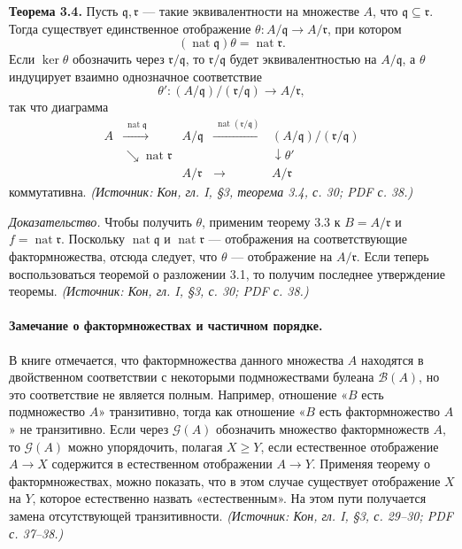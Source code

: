 \documentclass[a4paper,12pt]{article}
\begin{document}
\textbf{Теорема 3.4.} Пусть \(\mathfrak{q},\mathfrak{r}\) — такие эквивалентности на множестве \(A\), что \(\mathfrak{q}\subseteq\mathfrak{r}\). Тогда существует единственное отображение \(\theta\colon A/\mathfrak{q}\to A/\mathfrak{r}\), при котором
\[
(\operatorname{nat}\mathfrak{q})\theta=\operatorname{nat}\mathfrak{r}.
\]
Если \(\ker\theta\) обозначить через \(\mathfrak{r}/\mathfrak{q}\), то \(\mathfrak{r}/\mathfrak{q}\) будет эквивалентностью на \(A/\mathfrak{q}\), а \(\theta\) индуцирует взаимно однозначное соответствие
\[
\theta'\colon (A/\mathfrak{q})/(\mathfrak{r}/\mathfrak{q})\to A/\mathfrak{r},
\]
так что диаграмма
\[
\begin{array}{ccccc}
A & \xrightarrow{\ \operatorname{nat}\mathfrak{q}\ } & A/\mathfrak{q} & \xrightarrow{\ \operatorname{nat}(\mathfrak{r}/\mathfrak{q})\ } & (A/\mathfrak{q})/(\mathfrak{r}/\mathfrak{q})\\
& \searrow{\scriptstyle \operatorname{nat}\mathfrak{r}} & & & \downarrow{\scriptstyle \theta'}\\
& & A/\mathfrak{r} & \xrightarrow{\ \ }\ & A/\mathfrak{r}
\end{array}
\]
коммутативна.
\textit{(Источник: Кон, гл. I, §3, теорема 3.4, с. 30; PDF с. 38.)}

\emph{Доказательство.} Чтобы получить \(\theta\), применим теорему 3.3 к \(B=A/\mathfrak{r}\) и \(f=\operatorname{nat}\mathfrak{r}\). Поскольку \(\operatorname{nat}\mathfrak{q}\) и \(\operatorname{nat}\mathfrak{r}\) — отображения на соответствующие фактормножества, отсюда следует, что \(\theta\) — отображение на \(A/\mathfrak{r}\). Если теперь воспользоваться теоремой о разложении 3.1, то получим последнее утверждение теоремы.
\textit{(Источник: Кон, гл. I, §3, с. 30; PDF с. 38.)}

\paragraph{Замечание о фактормножествах и частичном порядке.}
В книге отмечается, что фактормножества данного множества \(A\) находятся в двойственном соответствии с некоторыми подмножествами булеана \(\mathcal{B}(A)\), но это соответствие не является полным. Например, отношение «\(B\) есть подмножество \(A\)» транзитивно, тогда как отношение «\(B\) есть фактормножество \(A\)» не транзитивно. Если через \(\mathcal{G}(A)\) обозначить множество фактормножеств \(A\), то \(\mathcal{G}(A)\) можно упорядочить, полагая \(X\ge Y\), если естественное отображение \(A\to X\) содержится в естественном отображении \(A\to Y\). Применяя теорему о фактормножествах, можно показать, что в этом случае существует отображение \(X\) на \(Y\), которое естественно назвать «естественным». На этом пути получается замена отсутствующей транзитивности.
\textit{(Источник: Кон, гл. I, §3, с. 29--30; PDF с. 37--38.)}
\end{document}
